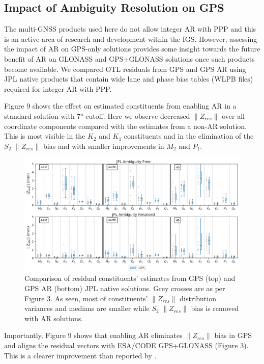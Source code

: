 \documentclass[se, manuscript]{copernicus}
\begin{document}
\subsection{Impact of Ambiguity Resolution on GPS}
The multi-GNSS products used here do not allow integer AR with PPP and this is an active area of research and development within the IGS. However, assessing the impact of AR on GPS-only solutions provides some insight towards the future benefit of AR on GLONASS and GPS+GLONASS solutions once such products become available. We compared OTL residuals from GPS and GPS AR using JPL native products that contain wide lane and phase bias tables (WLPB files) required for integer AR with PPP.

Figure 9 shows the effect on estimated constituents from enabling AR in a standard solution with 7° cutoff. Here we observe decreased $\|Z_{res}\|$ over all coordinate components compared with the estimates from a non-AR solution. This is most visible in the $K_2$ and $K_1$ constituents and in the elimination of the $S_2$ $\|Z_{res}\|$ bias and with smaller improvements in $M_2$ and $P_1$.

\begin{figure}[t]
\includegraphics[width=17cm]{fig09.png}
\caption{Comparison of residual constituents’ estimates from GPS (top) and GPS AR (bottom) JPL native solutions. Grey crosses are as per Figure 3. As seen, most of constituents’ $\|Z_{res}\|$ distribution variances and medians are smaller while $S_2$ $\|Z_{res}\|$ bias is removed with AR solutions.}
\end{figure}

Importantly, Figure 9 shows that enabling AR eliminates $\|Z_{res}\|$ bias in GPS and aligns the residual vectors with ESA/CODE GPS+GLONASS (Figure 3). This is a clearer improvement than reported by \cite{Thomas2006}. 
\end{document}
